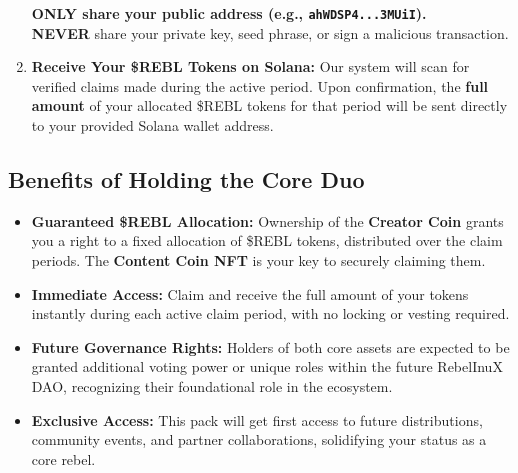 \documentclass{article}
\begin{document}
\begin{tcolorbox}[colback=headerColor!10!white, colframe=headerColor, boxrule=2pt, width=\textwidth, arc=6mm, left=8mm, right=8mm, top=6mm, bottom=6mm]
\begin{enumerate}
    \begin{tcolorbox}[colback=red!5!white, colframe=red!75!black, title=\textbf{SECURITY WARNING}, fonttitle=\bfseries]
    \textbf{ONLY share your public address (e.g., \texttt{ahWDSP4...3MUiI}).} \\\textbf{NEVER} share your private key, seed phrase, or sign a malicious transaction.
    \end{tcolorbox}

    \item \textbf{Receive Your \$REBL Tokens on Solana:} Our system will scan for verified claims made during the active period. Upon confirmation, the \textbf{full amount} of your allocated \$REBL tokens for that period will be sent directly to your provided Solana wallet address.
\end{enumerate}
\end{tcolorbox}

\begin{tcolorbox}[colback=headerColor!10!white, colframe=headerColor, boxrule=2pt, width=\textwidth, arc=6mm, left=8mm, right=8mm, top=6mm, bottom=6mm]
\subsection[
  \texorpdfstring{\color{primaryColor}Benefits of Holding the Core Duo}{Benefits of Holding the Core Duo}
]{\color{primaryColor}Benefits of Holding the Core Duo}
\begin{itemize}
    \item \textbf{Guaranteed \$REBL Allocation:} Ownership of the \textbf{Creator Coin} grants you a right to a fixed allocation of \$REBL tokens, distributed over the claim periods. The \textbf{Content Coin NFT} is your key to securely claiming them.
    \item \textbf{Immediate Access:} Claim and receive the full amount of your tokens instantly during each active claim period, with no locking or vesting required.
    \item \textbf{Future Governance Rights:} Holders of both core assets are expected to be granted additional voting power or unique roles within the future RebelInuX DAO, recognizing their foundational role in the ecosystem.
    \item \textbf{Exclusive Access:} This pack will get first access to future distributions, community events, and partner collaborations, solidifying your status as a core rebel.
\end{itemize}
\end{tcolorbox}
\end{document}
